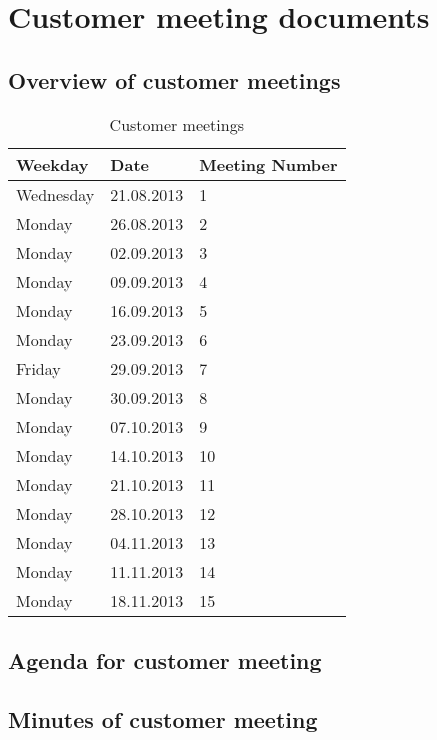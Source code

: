 \chapter{Customer meeting documents}
\label{AppendixE}

\section{Overview of customer meetings}

\begin{table}[h]
\begin{center}
\begin{tabular}{ l | l | l }
  \hline
  Weekday & Date & Meeting Number \\
  \hline\noalign{\smallskip}\noalign{\smallskip}\hline
  	Wednesday 	&	21.08.2013 & 1 \\
	Monday		&	26.08.2013 & 2 \\
	Monday		& 	02.09.2013 & 3 \\
	Monday 		&	09.09.2013 & 4 \\
	Monday 		&	16.09.2013 & 5 \\
	Monday 		&	23.09.2013 & 6 \\
	Friday 		&	29.09.2013 & 7 \\
	Monday 		&	30.09.2013 & 8 \\
	Monday 		&	07.10.2013 & 9 \\
	Monday 		&	14.10.2013 & 10 \\
	Monday 		&	21.10.2013 & 11 \\
	Monday 		&	28.10.2013 & 12 \\
	Monday 		&	04.11.2013 & 13 \\
	Monday 		&	11.11.2013 & 14 \\
	Monday 		&	18.11.2013 & 15 \\
  \hline
\end{tabular}
\end{center}
\caption{Customer meetings}
\label{table:customermeetings}
\end{table}

\section{Agenda for customer meeting}

\section{Minutes of customer meeting}
